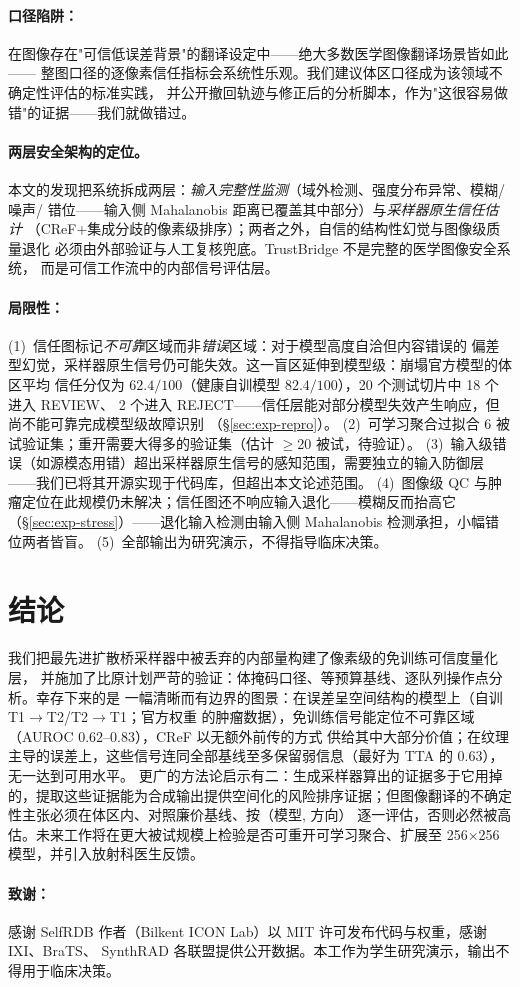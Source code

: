 \documentclass[11pt]{article}
\newcommand{\TrustMap}{信任图}
\begin{document}
\paragraph{口径陷阱：}
在图像存在"可信低误差背景"的翻译设定中——绝大多数医学图像翻译场景皆如此——
整图口径的逐像素信任指标会系统性乐观。我们建议体区口径成为该领域不确定性评估的标准实践，
并公开撤回轨迹与修正后的分析脚本，作为"这很容易做错"的证据——我们就做错过。
\paragraph{两层安全架构的定位。}
本文的发现把系统拆成两层：\emph{输入完整性监测}（域外检测、强度分布异常、模糊/噪声/
错位——输入侧 Mahalanobis 距离已覆盖其中部分）与\emph{采样器原生信任估计}
（CReF+集成分歧的像素级排序）；两者之外，自信的结构性幻觉与图像级质量退化
必须由外部验证与人工复核兜底。TrustBridge 不是完整的医学图像安全系统，
而是可信工作流中的内部信号评估层。
\paragraph{局限性：}
(1)~\TrustMap{}标记\emph{不可靠}区域而非\emph{错误}区域：对于模型高度自洽但内容错误的
偏差型幻觉，采样器原生信号仍可能失效。这一盲区延伸到模型级：崩塌官方模型的体区平均
信任分仅为 $62.4/100$（健康自训模型 $82.4/100$），20 个测试切片中 18 个进入 REVIEW、
2 个进入 REJECT——信任层能对部分模型失效产生响应，但尚不能可靠完成模型级故障识别
（\S\ref{sec:exp-repro}）。
(2)~可学习聚合过拟合 6 被试验证集；重开需要大得多的验证集（估计 $\ge$20 被试，待验证）。
(3)~输入级错误（如源模态用错）超出采样器原生信号的感知范围，需要独立的输入防御层
——我们已将其开源实现于代码库，但超出本文论述范围。
(4)~图像级 QC 与肿瘤定位在此规模仍未解决；信任图还不响应输入退化——模糊反而抬高它
（\S\ref{sec:exp-stress}）——退化输入检测由输入侧 Mahalanobis 检测承担，小幅错位两者皆盲。
(5)~全部输出为研究演示，不得指导临床决策。

\section{结论}
我们把最先进扩散桥采样器中被丢弃的内部量构建了像素级的免训练可信度量化层，
并施加了比原计划严苛的验证：体掩码口径、等预算基线、逐队列操作点分析。幸存下来的是
一幅清晰而有边界的图景：在误差呈空间结构的模型上（自训 T1$\to$T2/T2$\to$T1；官方权重
的肿瘤数据），免训练信号能定位不可靠区域（AUROC $0.62$--$0.83$），CReF 以无额外前传的方式
供给其中大部分价值；在纹理主导的误差上，这些信号连同全部基线至多保留弱信息（最好为 TTA 的
$0.63$），无一达到可用水平。
更广的方法论启示有二：生成采样器算出的证据多于它用掉的，提取这些证据能为合成输出提供空间化的风险排序证据；但图像翻译的不确定性主张必须在体区内、对照廉价基线、按（模型, 方向）
逐一评估，否则必然被高估。未来工作将在更大被试规模上检验是否可重开可学习聚合、扩展至
256$\times$256 模型，并引入放射科医生反馈。

\paragraph{致谢：}
感谢 SelfRDB 作者（Bilkent ICON Lab）以 MIT 许可发布代码与权重，感谢 IXI、BraTS、
SynthRAD 各联盟提供公开数据。本工作为学生研究演示，输出不得用于临床决策。



\end{document}
